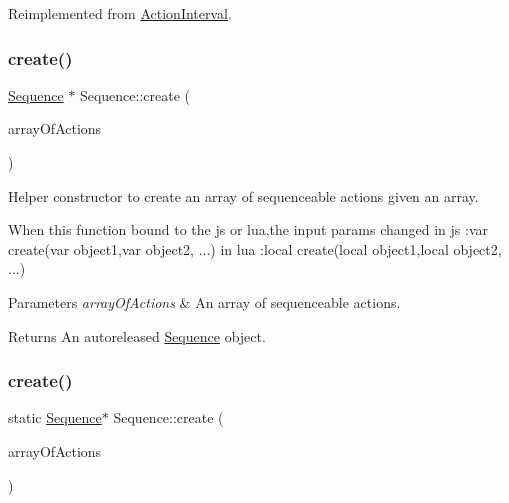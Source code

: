 Reimplemented from \hyperlink{classActionInterval_abc93ce0c2f54a90eb216a7803f25f44a}{Action\+Interval}.

\mbox{\label{classSequence_a7ff3322e0f0f7a24f9d21835962b66dd}} 
\subsubsection{\texorpdfstring{create()}{create()}\hspace{0.1cm}{\footnotesize\ttfamily [1/2]}}
{\footnotesize\ttfamily \hyperlink{classSequence}{Sequence} $\ast$ Sequence\+::create (\begin{DoxyParamCaption}\item[{const \hyperlink{classVector}{Vector}$<$ \hyperlink{classFiniteTimeAction}{Finite\+Time\+Action} $\ast$$>$ \&}]{array\+Of\+Actions }\end{DoxyParamCaption})\hspace{0.3cm}{\ttfamily [static]}}

Helper constructor to create an array of sequenceable actions given an array. 
\begin{DoxyCode}
When \textcolor{keyword}{this} \textcolor{keyword}{function} bound to the js or lua,the input params changed
in js  :var   create(var   object1,var   object2, ...)
in lua :local create(local object1,local object2, ...)
\end{DoxyCode}



\begin{DoxyParams}{Parameters}
{\em array\+Of\+Actions} & An array of sequenceable actions. \\
\hline
\end{DoxyParams}
\begin{DoxyReturn}{Returns}
An autoreleased \hyperlink{classSequence}{Sequence} object. 
\end{DoxyReturn}
\mbox{\label{classSequence_a54e77ba176054b306ca152056baada57}} 
\subsubsection{\texorpdfstring{create()}{create()}\hspace{0.1cm}{\footnotesize\ttfamily [2/2]}}
{\footnotesize\ttfamily static \hyperlink{classSequence}{Sequence}$\ast$ Sequence\+::create (\begin{DoxyParamCaption}\item[{const \hyperlink{classVector}{Vector}$<$ \hyperlink{classFiniteTimeAction}{Finite\+Time\+Action} $\ast$$>$ \&}]{array\+Of\+Actions }\end{DoxyParamCaption})\hspace{0.3cm}{\ttfamily [static]}}

